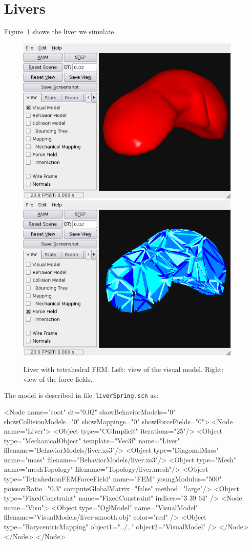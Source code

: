 \documentclass[a4paper,11pt]{article}
\newcommand{\file}[1]{\texttt{#1}}
\begin{document}
\section{Livers} \label{sec:livers}
Figure~\ref{fig:liverTetra} shows the liver we simulate.
\begin{figure}[ht]
	\centering
	\includegraphics[height=0.3\linewidth]{liverTetra.png}
	\includegraphics[height=0.3\linewidth]{liverTetra-force.png}
	\caption{Liver with tetrahedral FEM. Left: view of the visual model. Right: view of the force fields.}
	\label{fig:liverTetra}
\end{figure}

The model is described in file~\file{liverSpring.scn} as:
\begin{code_xml}
<Node name="root" dt="0.02" showBehaviorModels="0" showCollisionModels="0" showMappings="0" showForceFields="0">
	<Node name="Liver">
		<Object type="CGImplicit" iterations="25"/>
		<Object type="MechanicalObject" template="Vec3f" name="Liver" filename="BehaviorModels/liver.xs3"/>
		<Object type="DiagonalMass" name="mass" filename="BehaviorModels/liver.xs3"/>
		<Object type="Mesh" name="meshTopology" filename="Topology/liver.mesh"/>
		<Object type="TetrahedronFEMForceField" name="FEM" youngModulus="500" poissonRatio="0.3" computeGlobalMatrix="false" method="large"/>
                <Object type="FixedConstraint" name="FixedConstraint" indices="3 39 64" />
		<Node name="Visu">
			<Object type="OglModel" name="VisualModel" filename="VisualModels/liver-smooth.obj" color="red" />
			<Object type="BarycentricMapping" object1="../.." object2="VisualModel" />
		</Node>
	</Node>
</Node>
\end{code_xml}
\end{document}
